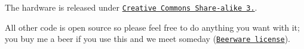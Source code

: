The hardware is released under \href{http://creativecommons.org/licenses/by-sa/3.0/}{\tt Creative Commons Share-\/alike 3.}.

All other code is open source so please feel free to do anything you want with it; you buy me a beer if you use this and we meet someday (\href{http://en.wikipedia.org/wiki/Beerware}{\tt Beerware license}). 